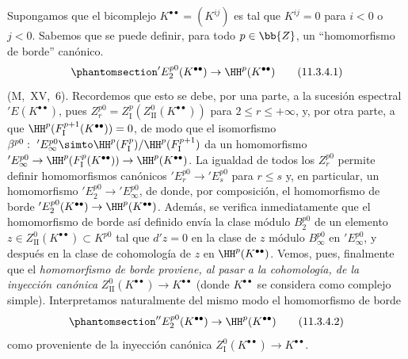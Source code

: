 \documentclass[oneside]{amsart}
\renewcommand{\leq}{\leqslant}
\let\EGAOriginalLabel\label
\renewcommand{\label}[1]{\phantomsection\EGAOriginalLabel{#1}}
\begin{document}
\begin{env}[11.3.4]
\label{0.11.3.4}
Supongamos que el bicomplejo $K^{\bullet\bullet}=(K^{ij})$ es tal que $K^{ij}=0$ para $i<0$ o $j<0$.
Sabemos que se puede definir, para todo $p\in\bb{Z}$, un ``homomorfismo de borde'' canónico.
\[
\label{0.11.3.4.1}
  'E_2^{p0}(K^{\bullet\bullet})
  \rightarrow \HH^{p}(K^{\bullet\bullet})
\tag{11.3.4.1}
\]
(M,~XV,~6).
Recordemos que esto se debe, por una parte, a la sucesión espectral
$'E(K^{\bullet\bullet})$, pues $Z_r^{p0}=Z_{\mathrm{I}}^{p}(Z_{\mathrm{II}}^{0}(K^{\bullet\bullet}))$ para $2\leq r \leq +\infty$, y, por otra parte, a que $\HH^{p}(F_\mathrm{I}^{p+1}(K^{\bullet\bullet})) = 0$, de modo que el isomorfismo $\beta^{p0}:\ 'E_\infty^{p0} \simto \HH^{p}(F_\mathrm{I}^p)/\HH^{p}(F_\mathrm{I}^{p+1})$ da un homomorfismo $'E_\infty^{p0} \rightarrow \HH^{p}(F_\mathrm{I}^p(K^{\bullet\bullet})) \rightarrow \HH^{p}(K^{\bullet\bullet})$.
La igualdad de todos los $Z_r^{p0}$ permite definir homomorfismos canónicos $'E_r^{p0} \rightarrow 'E_s^{p0}$ para $r \leq s$ y, en particular, un homomorfismo $'E_2^{p0} \rightarrow 'E_\infty^{p0}$, de donde, por composición, el homomorfismo de borde $'E_2^{p0}(K^{\bullet\bullet}) \rightarrow \HH^{p}(K^{\bullet\bullet})$.
Además, se verifica inmediatamente que el homomorfismo de borde así definido envía la clase módulo $B_2^{p0}$ de un elemento $z\in Z_\mathrm{II}^0(K^{\bullet\bullet})\subset K^{p0}$ tal que $d'z=0$ en la clase de $z$ módulo $B_\infty^{p0}$ en $'E_\infty^{p0}$, y después en la clase de cohomología de $z$ en $\HH^p(K^{\bullet\bullet})$.
Vemos, pues, finalmente que el \emph{homomorfismo de borde}  \emph{proviene, al pasar a la cohomología, de la inyección canónica} $Z_\mathrm{II}^0(K^{\bullet\bullet}) \rightarrow K^{\bullet\bullet}$ (donde $K^{\bullet\bullet}$ se considera como complejo simple).
Interpretamos naturalmente del mismo modo el homomorfismo de borde
\[
\label{0.11.3.4.2}
  ''E_2^{p0}(K^{\bullet\bullet})
  \rightarrow \HH^{p}(K^{\bullet\bullet})
\tag{11.3.4.2}
\]
como proveniente de la inyección canónica $Z_\mathrm{I}^0(K^{\bullet\bullet}) \rightarrow K^{\bullet\bullet}$.
\end{env}
\end{document}
